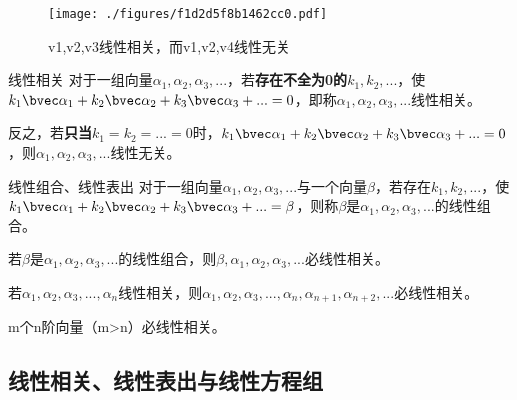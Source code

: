 

\begin{issues}
\issueDraft
{}
\end{issues}


\begin{figure}[ht]
\centering
\texttt{[image: ./figures/f1d2d5f8b1462cc0.pdf]}
\caption{v1,v2,v3线性相关，而v1,v2,v4线性无关} \label{fig_LnDpd2_1}
\end{figure}

\begin{definition}{线性相关}
对于一组向量$\alpha_1, \alpha_2,\alpha_3,...$，若\textbf{存在不全为0的}$k_1,k_2,...$，使$k_1 \bvec \alpha_1+k_2 \bvec \alpha_2+k_3 \bvec \alpha_3+...=0$，即称$\alpha_1, \alpha_2,\alpha_3,...$线性相关。

反之，若\textbf{只当}$k_1=k_2=...=0$时，$k_1 \bvec \alpha_1+k_2 \bvec \alpha_2+k_3 \bvec \alpha_3+...=0$，则$\alpha_1, \alpha_2,\alpha_3,...$线性无关。
\end{definition}

\begin{definition}{线性组合、线性表出}
对于一组向量$\alpha_1, \alpha_2,\alpha_3,...$与一个向量$\beta$，若存在$k_1,k_2,...$，使$k_1 \bvec \alpha_1+k_2 \bvec \alpha_2+k_3 \bvec \alpha_3+...=\beta$，则称$\beta$是$\alpha_1, \alpha_2,\alpha_3,...$的线性组合。
\end{definition}

\begin{theorem}{}
若$\beta$是$\alpha_1, \alpha_2,\alpha_3,...$的线性组合，则$\beta, \alpha_1, \alpha_2,\alpha_3,...$必线性相关。
\end{theorem}

\begin{theorem}{}
若$\alpha_1, \alpha_2,\alpha_3,...,\alpha_n$线性相关，则$\alpha_1, \alpha_2,\alpha_3,...,\alpha_n,\alpha_{n+1},\alpha_{n+2},...$必线性相关。
\end{theorem}

\begin{theorem}{}
m个n阶向量（m>n）必线性相关。
\end{theorem}

\subsection{线性相关、线性表出与线性方程组}

